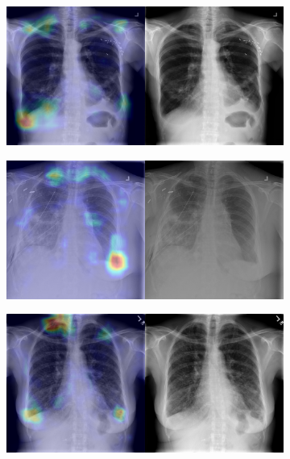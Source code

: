 \begin{figure}[b]
\begin{subfigure}{0.4\textwidth}
    \end{subfigure}
    \begin{subfigure}{0.4\textwidth}
        \centering
        \includegraphics[width=1.0\textwidth]{Chapters/5. Conclusiones/img/Pleural-Thickening/1_1_00001093_001.png}
    \end{subfigure}
    \begin{subfigure}{0.4\textwidth}
        \centering
        \includegraphics[width=1.0\textwidth]{Chapters/5. Conclusiones/img/Pleural-Thickening/1_1_00001248_006.png}
    \end{subfigure}
    \begin{subfigure}{0.4\textwidth}
        \centering
        \includegraphics[width=1.0\textwidth]{Chapters/5. Conclusiones/img/Pleural-Thickening/1_1_00001320_005.png}

\end{subfigure}
\end{figure}
